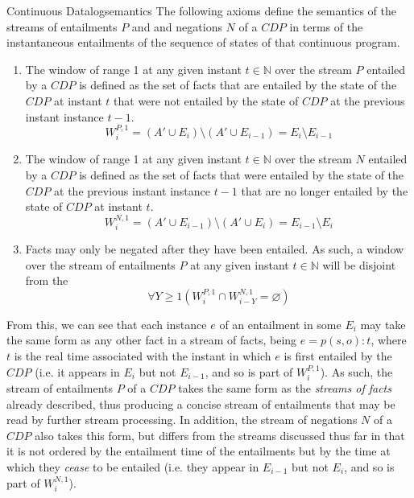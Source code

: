 \begin{nestedsection}{Continuous Datalog}{semantics}
	The following axioms define the semantics of the streams of entailments $P$ and and negations $N$ of a ${CDP}$ in terms of the instantaneous entailments of the sequence of states of that continuous program.
	\begin{enumerate}\setcounter{enumi}{\thecontinuousDatalogAxioms}
		\item\label{axiom:continuous datalog: positive window increment}
			The window of range 1 at any given instant ${t \in \mathbb{N}}$ over the stream $P$ entailed by a ${CDP}$ is defined as the set of facts that are entailed by the state of the ${CDP}$ at instant $t$ that were not entailed by the state of ${CDP}$ at the previous instant instance ${t-1}$.
			\begin{equation*}
				W^{P,1}_{i} = \left( A' \cup E_{i} \right) \setminus \left( A' \cup E_{i-1} \right) = E_{i} \setminus E_{i-1}
			\end{equation*}
		\item\label{axiom:continuous datalog: negative window increment}
			The window of range 1 at any given instant ${t \in \mathbb{N}}$ over the stream $N$ entailed by a ${CDP}$ is defined as the set of facts that were entailed by the state of the ${CDP}$ at the previous instant instance ${t-1}$ that are no longer entailed by the state of ${CDP}$ at instant $t$.
			\begin{equation*}
				W^{N,1}_{i} = \left( A' \cup E_{i-1} \right) \setminus \left( A' \cup E_{i} \right) = E_{i-1} \setminus E_{i}
			\end{equation*}
		\item\label{axiom:continuous datalog: entailment precedes negation}
			Facts may only be negated after they have been entailed.
			As such, a window over the stream of entailments $P$ at any given instant ${t \in \mathbb{N}}$ will be disjoint from the 
			\begin{equation*}
				\forall Y \geq 1 \left( W^{P,1}_{i} \cap W^{N,1}_{i-Y} = \varnothing \right)
			\end{equation*}
		\setcounter{continuousDatalogAxioms}{\theenumi}
	\end{enumerate}

	From this, we can see that each instance $e$ of an entailment in some $E_{i}$ may take the same form as any other fact in a stream of facts, being ${e = p(s,o):t}$, where $t$ is the real time associated with the instant in which $e$ is first entailed by the ${CDP}$ (i.e. it appears in $E_{i}$ but not $E_{i-1}$, and so is part of $W^{P,1}_{i}$).
	As such, the stream of entailments $P$ of a ${CDP}$ takes the same form as the \emph{streams of facts} already described, thus producing a concise stream of entailments that may be read by further stream processing.
	In addition, the stream of negations $N$ of a ${CDP}$ also takes this form, but differs from the streams discussed thus far in that it is not ordered by the entailment time of the entailments but by the time at which they \emph{cease} to be entailed (i.e. they appear in $E_{i-1}$ but not $E_{i}$, and so is part of $W^{N,1}_{i}$).


\end{nestedsection}

